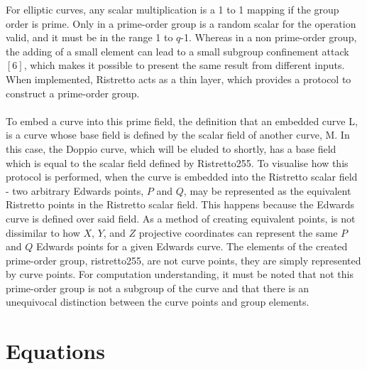 \documentclass{article}
\begin{document}
For elliptic curves, any scalar multiplication is a 1 to 1 mapping if the group order is prime. Only in a prime-order group is a random scalar for the operation valid, and it must be in the range 1 to $q$-1. Whereas in a non prime-order group, the adding of a small element can lead to a small subgroup confinement attack$[6]$, which makes it possible to present the same result from different inputs. When implemented, Ristretto acts as a thin layer, which provides a protocol to construct a prime-order group.  \\\\
To embed a curve into this prime field, the definition that an embedded curve L, is a curve whose base field is defined by the scalar field of another curve, M. In this case, the Doppio curve, which will be eluded to shortly, has a base field which is equal to the scalar field defined by Ristretto255. To visualise how this protocol is performed, when the curve is embedded into the Ristretto scalar field - two arbitrary Edwards points, $P$ and $Q$, may be represented as the equivalent Ristretto points in the Ristretto scalar field. This happens because the Edwards curve is defined over said field. As a method of creating equivalent points, is not dissimilar to how $X$, $Y$, and $Z$ projective coordinates can represent the same $P$ and $Q$ Edwards points for a given Edwards curve. The elements of the created prime-order group, ristretto255, are not curve points, they are simply represented by curve points. For computation understanding, it must be noted that not this prime-order group is not a subgroup of the curve and that there is an unequivocal distinction between the curve points and group elements. 
\section{Equations}
\end{document}
